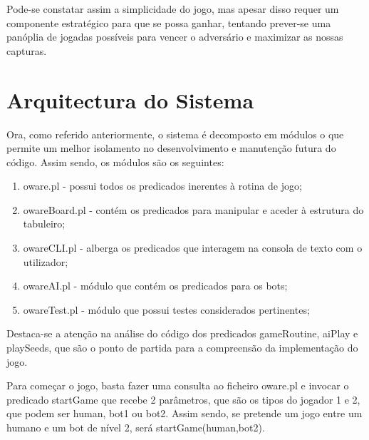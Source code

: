\documentclass[15pt,a4paper]{article}
\begin{document}
Pode-se constatar assim a simplicidade do jogo, mas apesar disso requer um componente estratégico para que se possa ganhar, tentando prever-se uma panóplia de jogadas possíveis para vencer o adversário e maximizar as nossas capturas.

\section{Arquitectura do Sistema}
Ora, como referido anteriormente, o sistema é decomposto em módulos o que permite um melhor isolamento no desenvolvimento e manutenção futura do código. Assim sendo, os módulos são os seguintes:
\begin{enumerate}
  \item oware.pl - possui todos os predicados inerentes à rotina de jogo;
  \item owareBoard.pl - contém os predicados para manipular e aceder à estrutura do tabuleiro;
  \item owareCLI.pl - alberga os predicados que interagem na consola de texto com o utilizador;
  \item owareAI.pl - módulo que contém os predicados para os bots;
  \item owareTest.pl - módulo que possui testes considerados pertinentes;
\end{enumerate}

\indent Destaca-se a atenção na análise do código dos predicados gameRoutine, aiPlay e playSeeds, que são o ponto de partida para a compreensão da implementação do jogo.

\indent Para começar o jogo, basta fazer uma consulta ao ficheiro oware.pl e invocar o predicado startGame que recebe 2 parâmetros, que são os tipos do jogador 1 e 2, que podem ser human, bot1 ou bot2. Assim sendo, se pretende um jogo entre um humano e um bot de nível 2, será startGame(human,bot2). 


\newpage
\end{document}

